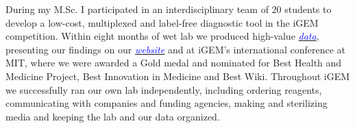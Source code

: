 \documentclass[11pt,a4paper,sans]{moderncv}
\begin{document}
\begin{spacing}{1.1}
During my M.Sc. I participated in an interdisciplinary team of 20 students to develop a low-cost, multiplexed and label-free diagnostic tool %
in the iGEM competition.
Within eight months of wet lab we produced high-value {\href{https://www.ncbi.nlm.nih.gov/pubmed/29803867}{\textcolor{blue}{\textit{data}}}}, presenting our findings on our 
{\href{http://2015.igem.org/Team:Freiburg/Home_Intro}{\textcolor{blue}{\textit{website}}}} and at iGEM's international conference at MIT, where we were awarded a Gold medal and nominated for Best Health and Medicine Project, Best Innovation in Medicine and Best Wiki.
Throughout iGEM we successfully ran our own lab independently, including ordering reagents, communicating with companies and funding agencies, making and sterilizing media and keeping the lab and our data organized. 
\par\vspace*{3mm}


\end{spacing}
\end{document}
